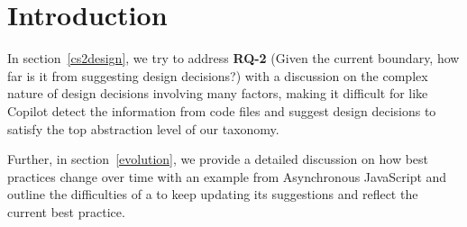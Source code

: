 \label{chapter:discussion}

\section{Introduction}
In section~\ref{cs2design}, we try to address \textbf{RQ-2} (Given the current boundary, how far is it from suggesting design decisions?) with a discussion on the complex nature of design decisions involving many factors, making it difficult for \cct{} like Copilot detect the information from code files and suggest design decisions to satisfy the top abstraction level of our taxonomy.

Further, in section~\ref{evolution}, we provide a detailed discussion on how best practices change over time with an example from Asynchronous JavaScript and outline the difficulties of a \cct{} to keep updating its suggestions and reflect the current best practice.








